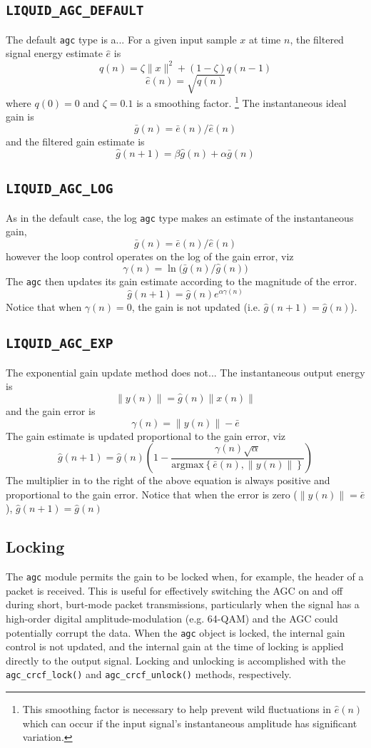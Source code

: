 \subsection{{\tt LIQUID\_AGC\_DEFAULT}}
The default {\tt agc} type is a... For a given input sample $x$ at time $n$,
the filtered signal energy estimate $\hat{e}$ is
\[  q(n) = \zeta\|x\|^2 + (1-\zeta)q(n-1)   \]
\[  \hat{e}(n) = \sqrt{q(n)}                \]
where $q(0)=0$ and $\zeta=0.1$ is a smoothing factor.%
\footnote{This smoothing factor is necessary to help prevent wild fluctuations
in $\hat{e}(n)$ which can occur if the input signal's instantaneous amplitude
has significant variation.}
The instantaneous ideal gain is
\[
    \bar{g}(n) = \bar{e}(n) / \hat{e}(n)
\]
and the filtered gain estimate is
\[
    \hat{g}(n+1) = \beta \hat{g}(n) + \alpha \bar{g}(n)
\]

\subsection{{\tt LIQUID\_AGC\_LOG}}
As in the default case, the log {\tt agc} type makes an estimate of the
instantaneous gain,
\[
    \bar{g}(n) = \bar{e}(n) / \hat{e}(n)
\]
however the loop control operates on the log of the gain error, viz
\[
    \gamma(n) = \ln\bigl( \bar{g}(n) / \hat{g}(n) \bigr)
\]
The {\tt agc} then updates its gain estimate according to the magnitude of the
error.
\[
    \hat{g}(n+1) = \hat{g}(n) e^{ \alpha \gamma(n) }
\]
Notice that when $\gamma(n)=0$, the gain is not updated
(i.e. $\hat{g}(n+1) = \hat{g}(n)$).


\subsection{{\tt LIQUID\_AGC\_EXP}}
The exponential gain update method does not...
The instantaneous output energy is
\[  \|y(n)\| = \hat{g}(n)\|x(n)\|      \]
and the gain error is
\[
    \gamma(n) = \|y(n)\| - \bar{e}
\]
The gain estimate is updated proportional to the gain error, viz
\[
    \hat{g}(n+1) =
        \hat{g}(n) \left(1 -
         \frac{
            \gamma(n)\sqrt{\alpha}
        }{
            \text{argmax}\left\{\bar{e}(n),\|y(n)\|\right\}
        }
    \right)
\]
The multiplier in to the right of the above equation is always positive
and proportional to the gain error.
Notice that when the error is zero ($\|y(n)\| = \bar{e}$),
$\hat{g}(n+1) = \hat{g}(n)$


\subsection{Locking}
The {\tt agc} module permits the gain to be locked when, for example, the
header of a packet is received.
This is useful for effectively switching the AGC on and off during short,
burt-mode packet transmissions, particularly when the signal has a high-order
digital amplitude-modulation (e.g. 64-QAM) and the AGC could potentially
corrupt the data.
When the {\tt agc} object is locked, the internal gain control is not updated,
and the internal gain at the time of locking is applied directly to the output
signal.
%
Locking and unlocking is accomplished with the
{\tt agc\_crcf\_lock()} and
{\tt agc\_crcf\_unlock()} methods, respectively.


